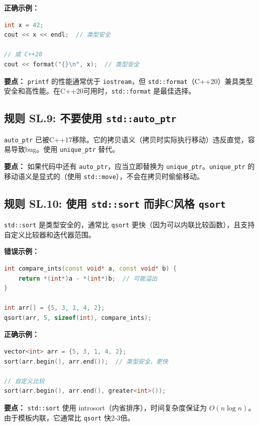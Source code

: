 \textbf{正确示例：}

\begin{lstlisting}[language=C++]
int x = 42;
cout << x << endl;  // 类型安全

// 或 C++20
cout << format("{}\n", x);  // 类型安全
\end{lstlisting}

\textbf{要点：} \texttt{printf} 的性能通常优于 \texttt{iostream}，但 \texttt{std::format}（C++20）兼具类型安全和高性能。在C++20可用时，\texttt{std::format} 是最佳选择。

\subsection*{\textbf{规则 SL.9:} 不要使用 \texttt{std::auto\_ptr}}

\texttt{auto\_ptr} 已被C++17移除。它的拷贝语义（拷贝时实际执行移动）违反直觉，容易导致bug。使用 \texttt{unique\_ptr} 替代。

\textbf{要点：} 如果代码中还有 \texttt{auto\_ptr}，应当立即替换为 \texttt{unique\_ptr}。\texttt{unique\_ptr} 的移动语义是显式的（使用 \texttt{std::move}），不会在拷贝时偷偷移动。

\subsection*{\textbf{规则 SL.10:} 使用 \texttt{std::sort} 而非C风格 \texttt{qsort}}

\texttt{std::sort} 是类型安全的，通常比 \texttt{qsort} 更快（因为可以内联比较函数），且支持自定义比较器和迭代器范围。

\textbf{错误示例：}

\begin{lstlisting}[language=C++]
int compare_ints(const void* a, const void* b) {
    return *(int*)a - *(int*)b;  // 可能溢出
}

int arr[] = {5, 3, 1, 4, 2};
qsort(arr, 5, sizeof(int), compare_ints);
\end{lstlisting}

\textbf{正确示例：}

\begin{lstlisting}[language=C++]
vector<int> arr = {5, 3, 1, 4, 2};
sort(arr.begin(), arr.end());  // 类型安全，更快

// 自定义比较
sort(arr.begin(), arr.end(), greater<int>());
\end{lstlisting}

\textbf{要点：} \texttt{std::sort} 使用 introsort（内省排序），时间复杂度保证为 $O(n \log n)$。由于模板内联，它通常比 \texttt{qsort} 快2-3倍。


